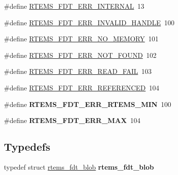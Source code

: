 \begin{DoxyCompactItemize}
\item 
\#define \mbox{\hyperlink{rtems-fdt_8h_aeb4caa4ae7a6ee091aba109d321a1d12}{R\+T\+E\+M\+S\+\_\+\+F\+D\+T\+\_\+\+E\+R\+R\+\_\+\+I\+N\+T\+E\+R\+N\+AL}}~13
\item 
\#define \mbox{\hyperlink{rtems-fdt_8h_a7e6f3cad8bb35b7827abd788a1f2afb3}{R\+T\+E\+M\+S\+\_\+\+F\+D\+T\+\_\+\+E\+R\+R\+\_\+\+I\+N\+V\+A\+L\+I\+D\+\_\+\+H\+A\+N\+D\+LE}}~100
\item 
\#define \mbox{\hyperlink{rtems-fdt_8h_aceaa83d086fdece4ae7b58063444e4f8}{R\+T\+E\+M\+S\+\_\+\+F\+D\+T\+\_\+\+E\+R\+R\+\_\+\+N\+O\+\_\+\+M\+E\+M\+O\+RY}}~101
\item 
\#define \mbox{\hyperlink{rtems-fdt_8h_af669f9280824e70fcf06a377724be893}{R\+T\+E\+M\+S\+\_\+\+F\+D\+T\+\_\+\+E\+R\+R\+\_\+\+N\+O\+T\+\_\+\+F\+O\+U\+ND}}~102
\item 
\#define \mbox{\hyperlink{rtems-fdt_8h_a35e372e1e99ca64f229614e5c7fa7bc7}{R\+T\+E\+M\+S\+\_\+\+F\+D\+T\+\_\+\+E\+R\+R\+\_\+\+R\+E\+A\+D\+\_\+\+F\+A\+IL}}~103
\item 
\#define \mbox{\hyperlink{rtems-fdt_8h_aef76af337c06a43049c280b90b3f2755}{R\+T\+E\+M\+S\+\_\+\+F\+D\+T\+\_\+\+E\+R\+R\+\_\+\+R\+E\+F\+E\+R\+E\+N\+C\+ED}}~104
\item 
\mbox{\label{rtems-fdt_8h_ad1f3efabdbdf9b96522d711aa4911ef1}} 
\#define {\bfseries R\+T\+E\+M\+S\+\_\+\+F\+D\+T\+\_\+\+E\+R\+R\+\_\+\+R\+T\+E\+M\+S\+\_\+\+M\+IN}~100
\item 
\mbox{\label{rtems-fdt_8h_aeab64b1535655dc3f2eaec0d77db585a}} 
\#define {\bfseries R\+T\+E\+M\+S\+\_\+\+F\+D\+T\+\_\+\+E\+R\+R\+\_\+\+M\+AX}~104
\end{DoxyCompactItemize}
\subsection*{Typedefs}
\begin{DoxyCompactItemize}
\item 
\mbox{\label{rtems-fdt_8h_ac716d8c4c221b55ee318476ad8ee7aba}} 
typedef struct \mbox{\hyperlink{structrtems__fdt__blob}{rtems\+\_\+fdt\+\_\+blob}} {\bfseries rtems\+\_\+fdt\+\_\+blob}
\end{DoxyCompactItemize}
